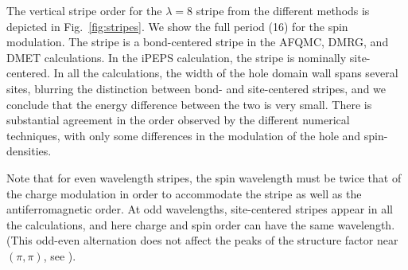 \documentclass[12pt]{article}
\begin{document}

The vertical stripe order for the $\lambda= 8$ stripe from the different methods is depicted in Fig.~\ref{fig:stripes}. 
We show the full period (16) for the spin modulation. The stripe is a  bond-centered stripe in the AFQMC, DMRG, and DMET calculations.
In the iPEPS calculation, the stripe is nominally site-centered.
In all the calculations, the width of the hole domain wall spans several sites,
blurring the distinction between bond- and site-centered stripes, and we conclude that the energy difference between
the two is very small. 
There is substantial agreement in the order observed by the different numerical techniques, with only some
differences in the modulation of the hole and spin-densities. 

Note that for even wavelength stripes, the spin wavelength must be twice that of the charge modulation in order to 
accommodate the stripe as well as the antiferromagnetic order. At odd wavelengths,  site-centered stripes appear in all the calculations, and here charge and spin order can have the same wavelength. (This odd-even alternation
does not affect the peaks of the structure factor near $(\pi,\pi)$, see \cite{supplementary}).
\end{document}
